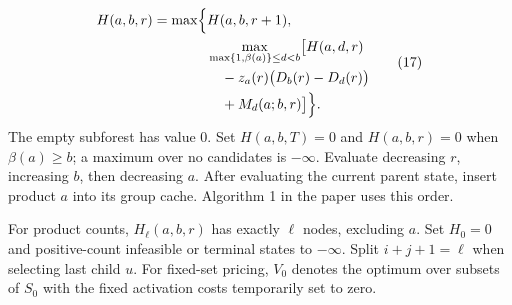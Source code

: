 \begin{equation}
\begin{aligned}
H(a,b,r)=\max\Bigl\{&H(a,b,r+1),\\
&\max_{\max\{1,\beta(a)\}\le d<b}\bigl[H(a,d,r)\\
&\quad-z_a(r)\bigl(D_b(r)-D_d(r)\bigr)\\
&\quad+M_d(a;b,r)\bigr]\Bigr\}.
\end{aligned}
\label{eq:s5_6}
\tag{17}
\end{equation}
The empty subforest has value 0. Set $H(a,b,T)=0$ and $H(a,b,r)=0$ when $\beta(a)\ge b$; a maximum over no candidates is $-\infty$. Evaluate decreasing $r$, increasing $b$, then decreasing $a$. After evaluating the current parent state, insert product $a$ into its group cache. Algorithm 1 in the paper uses this order.

For product counts, $H_\ell(a,b,r)$ has exactly $\ell$ nodes, excluding $a$. Set $H_0=0$ and positive-count infeasible or terminal states to $-\infty$. Split $i+j+1=\ell$ when selecting last child $u$. For fixed-set pricing, $V_0$ denotes the optimum over subsets of $S_0$ with the fixed activation costs temporarily set to zero.
